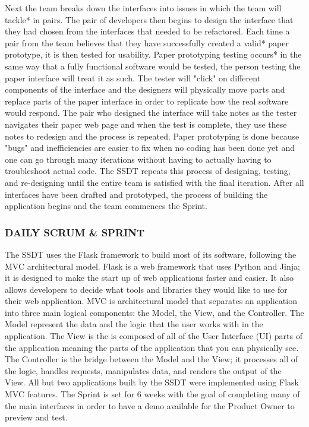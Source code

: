Next the team breaks down the interfaces into issues in which the team will tackle* in pairs. The pair of developers then begins to design the interface that they had chosen from the interfaces that needed to be refactored. Each time a pair from the team believes that they have successfully created a valid* paper prototype, it is then tested for usability. Paper prototyping testing occurs* in  the same way that a fully functional software would be tested, the person testing the paper interface will treat it as such. The tester will "click" on different components of the interface and the designers will physically move parts and replace parts of the paper interface in order to replicate how the real software would respond. The pair who designed the interface will take notes as the tester navigates their paper web page and when the test is complete, they use these notes to redesign and the process is repeated. Paper prototyping is done because "bugs" and inefficiencies are easier to fix when no coding has been done yet and one can go through many iterations without having to actually having to troubleshoot actual code. The SSDT repeats this process of designing, testing, and re-designing until the entire team is satisfied with the final iteration. After all interfaces have been drafted and prototyped, the process of building the application begins and the team commences the Sprint.


\subsubsection{ DAILY SCRUM \& SPRINT} %
The SSDT uses the Flask framework to build most of its software, following the MVC architectural model. Flask is a web framework that uses Python and Jinja; it is designed to make the start up of web applications faster and easier. It also allows developers to decide what tools and libraries they would like to use for their web application. MVC is architectural model that separates an application into three main logical components: the Model, the View, and the Controller. The Model represent the data and the logic that the user works with in the application. The View is the is composed of all of the User Interface (UI) parts of the application meaning the parts of the application that you can physically see. The Controller is the bridge between the Model and the View; it processes all of the logic, handles requests, manipulates data, and renders the output of the View. All but two applications built by the SSDT were implemented using Flask MVC features. The Sprint is set for 6 weeks with the goal of completing many of the main interfaces in order to have a demo available for  the Product Owner to preview and test.

